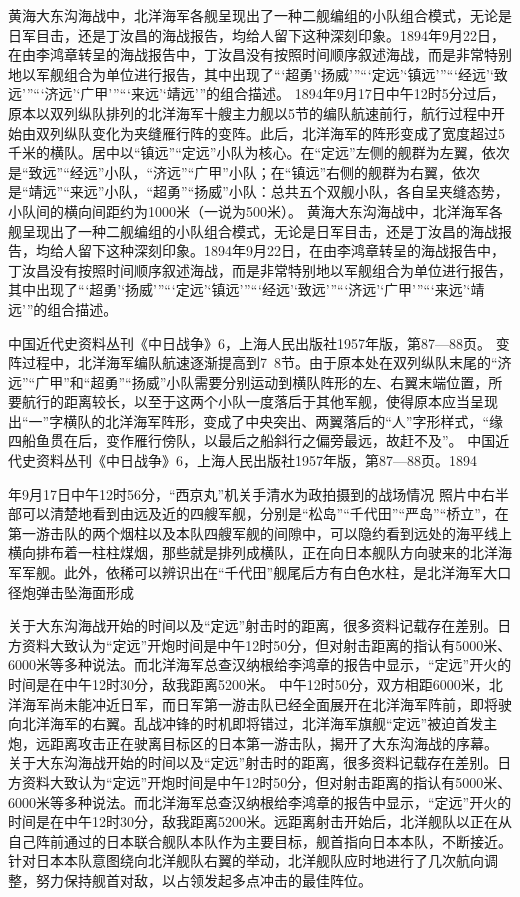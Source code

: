 \documentclass[12pt,UTF8]{ctexbook}
\begin{document}
黄海大东沟海战中，北洋海军各舰呈现出了一种二舰编组的小队组合模式，无论是日军目击，还是丁汝昌的海战报告，均给人留下这种深刻印象。1894年9月22日，在由李鸿章转呈的海战报告中，丁汝昌没有按照时间顺序叙述海战，而是非常特别地以军舰组合为单位进行报告，其中出现了“‘超勇’‘扬威’”“‘定远’‘镇远’”“‘经远’‘致远’”“‘济远’‘广甲’”“‘来远’‘靖远’”的组合描述。
1894年9月17日中午12时5分过后，原本以双列纵队排列的北洋海军十艘主力舰以5节的编队航速前行，航行过程中开始由双列纵队变化为夹缝雁行阵的变阵。此后，北洋海军的阵形变成了宽度超过5千米的横队。居中以“镇远”“定远”小队为核心。在“定远”左侧的舰群为左翼，依次是“致远”“经远”小队，“济远”“广甲”小队；在“镇远”右侧的舰群为右翼，依次是“靖远”“来远”小队，“超勇”“扬威”小队：总共五个双舰小队，各自呈夹缝态势，小队间的横向间距约为1000米（一说为500米）。 黄海大东沟海战中，北洋海军各舰呈现出了一种二舰编组的小队组合模式，无论是日军目击，还是丁汝昌的海战报告，均给人留下这种深刻印象。1894年9月22日，在由李鸿章转呈的海战报告中，丁汝昌没有按照时间顺序叙述海战，而是非常特别地以军舰组合为单位进行报告，其中出现了“‘超勇’‘扬威’”“‘定远’‘镇远’”“‘经远’‘致远’”“‘济远’‘广甲’”“‘来远’‘靖远’”的组合描述。

中国近代史资料丛刊《中日战争》6，上海人民出版社1957年版，第87—88页。
变阵过程中，北洋海军编队航速逐渐提高到7~8节。由于原本处在双列纵队末尾的“济远”“广甲”和“超勇”“扬威”小队需要分别运动到横队阵形的左、右翼末端位置，所要航行的距离较长，以至于这两个小队一度落后于其他军舰，使得原本应当呈现出“一”字横队的北洋海军阵形，变成了中央突出、两翼落后的“人”字形样式，“缘四船鱼贯在后，变作雁行傍队，以最后之船斜行之偏旁最远，故赶不及”。 中国近代史资料丛刊《中日战争》6，上海人民出版社1957年版，第87—88页。1894


年9月17日中午12时56分，“西京丸”机关手清水为政拍摄到的战场情况 照片中右半部可以清楚地看到由远及近的四艘军舰，分别是“松岛”“千代田”“严岛”“桥立”，在第一游击队的两个烟柱以及本队四艘军舰的间隙中，可以隐约看到远处的海平线上横向排布着一柱柱煤烟，那些就是排列成横队，正在向日本舰队方向驶来的北洋海军军舰。此外，依稀可以辨识出在“千代田”舰尾后方有白色水柱，是北洋海军大口径炮弹击坠海面形成

关于大东沟海战开始的时间以及“定远”射击时的距离，很多资料记载存在差别。日方资料大致认为“定远”开炮时间是中午12时50分，但对射击距离的指认有5000米、6000米等多种说法。而北洋海军总查汉纳根给李鸿章的报告中显示，“定远”开火的时间是在中午12时30分，敌我距离5200米。
中午12时50分，双方相距6000米，北洋海军尚未能冲近日军，而日军第一游击队已经全面展开在北洋海军阵前，即将驶向北洋海军的右翼。乱战冲锋的时机即将错过，北洋海军旗舰“定远”被迫首发主炮，远距离攻击正在驶离目标区的日本第一游击队，揭开了大东沟海战的序幕。 关于大东沟海战开始的时间以及“定远”射击时的距离，很多资料记载存在差别。日方资料大致认为“定远”开炮时间是中午12时50分，但对射击距离的指认有5000米、6000米等多种说法。而北洋海军总查汉纳根给李鸿章的报告中显示，“定远”开火的时间是在中午12时30分，敌我距离5200米。远距离射击开始后，北洋舰队以正在从自己阵前通过的日本联合舰队本队作为主要目标，舰首指向日本本队，不断接近。针对日本本队意图绕向北洋舰队右翼的举动，北洋舰队应时地进行了几次航向调整，努力保持舰首对敌，以占领发起多点冲击的最佳阵位。
\end{document}
